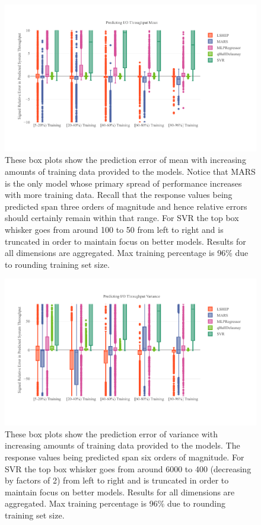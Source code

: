 \begin{figure}
  \centering
  \includegraphics[width=\textwidth,trim={0 .5in 0 .3in}]{Figures/HPC/Mean_TT_Ratio.pdf}
  \caption{These box plots show the prediction error of mean with
    increasing amounts of training data provided to the models. Notice
    that MARS is the only model whose primary spread of performance
    increases with more training data. Recall that the response values
    being predicted span three orders of magnitude and hence relative
    errors should certainly remain within that range. For SVR the top
    box whisker goes from around 100 to 50 from left to right and is
    truncated in order to maintain focus on better models. Results for
    all dimensions are aggregated. Max training percentage is 96\% due
    to rounding training set size.}
  \label{fig:mean_tt_ratio}
\end{figure}

\begin{figure}
  \centering
  \includegraphics[width=\textwidth,trim={0 .5in 0 .3in}]{Figures/HPC/Var_TT_Ratio.pdf}
  \caption{These box plots show the prediction error of variance with
    increasing amounts of training data provided to the models. The
    response values being predicted span six orders of magnitude. For
    SVR the top box whisker goes from around 6000 to 400 (decreasing
    by factors of 2) from left to right and is truncated in order to
    maintain focus on better models. Results for all dimensions are
    aggregated. Max training percentage is 96\% due to rounding
    training set size.}
  \label{fig:var_tt_ratio}
\end{figure}
 

